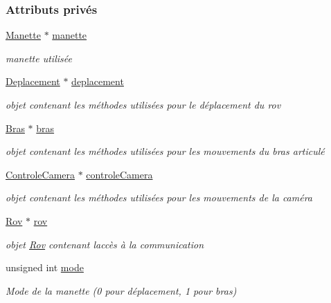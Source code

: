 \subsubsection*{Attributs privés}
\begin{DoxyCompactItemize}
\item 
\hyperlink{class_manette}{Manette} $\ast$ \hyperlink{class_controle_rov_af5caffd78d06f90d045b53ee87ad76df}{manette}
\begin{DoxyCompactList}\small\item\em manette utilisée \end{DoxyCompactList}\item 
\hyperlink{class_deplacement}{Deplacement} $\ast$ \hyperlink{class_controle_rov_ae96443be0a82814b27958e6ceb0a0acf}{deplacement}
\begin{DoxyCompactList}\small\item\em objet contenant les méthodes utilisées pour le déplacement du rov \end{DoxyCompactList}\item 
\hyperlink{class_bras}{Bras} $\ast$ \hyperlink{class_controle_rov_a1b2e394dd6332b2acd1be0770451e140}{bras}
\begin{DoxyCompactList}\small\item\em objet contenant les méthodes utilisées pour les mouvements du bras articulé \end{DoxyCompactList}\item 
\hyperlink{class_controle_camera}{Controle\+Camera} $\ast$ \hyperlink{class_controle_rov_ac88fe7f2367cca5a24aeda187ee0bac2}{controle\+Camera}
\begin{DoxyCompactList}\small\item\em objet contenant les méthodes utilisées pour les mouvements de la caméra \end{DoxyCompactList}\item 
\hyperlink{class_rov}{Rov} $\ast$ \hyperlink{class_controle_rov_a3620b701fbb3aebe6a57ca3f3f04c6ca}{rov}
\begin{DoxyCompactList}\small\item\em objet \hyperlink{class_rov}{Rov} contenant l\textquotesingle{}accès à la communication \end{DoxyCompactList}\item 
unsigned int \hyperlink{class_controle_rov_a5d1fb6ad14da49e3c587199ae86dc28d}{mode}
\begin{DoxyCompactList}\small\item\em Mode de la manette (0 pour déplacement, 1 pour bras) \end{DoxyCompactList}\end{DoxyCompactItemize}


